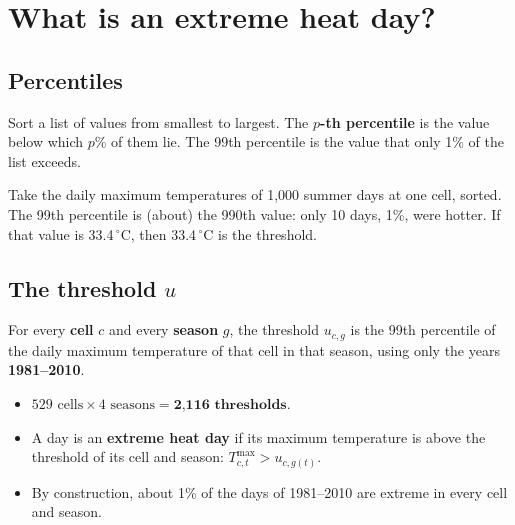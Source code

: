 \chapter{What is an extreme heat day?}
\label{ch:extreme}

\section{Percentiles}
Sort a list of values from smallest to largest. The \textbf{$p$-th percentile} is the value below which $p$\% of them
lie. The 99th percentile is the value that only 1\% of the list exceeds.

\begin{example}
Take the daily maximum temperatures of 1{,}000 summer days at one cell, sorted. The 99th percentile is (about) the
990th value: only 10 days, 1\%, were hotter. If that value is 33.4\,$^\circ$C, then 33.4\,$^\circ$C is the threshold.
\end{example}

\section{The threshold $u$}
For every \textbf{cell} $c$ and every \textbf{season} $g$, the threshold $u_{c,g}$ is the 99th percentile of the daily
maximum temperature of that cell in that season, using only the years \textbf{1981--2010}.
\begin{itemize}
  \item $529\text{ cells}\times4\text{ seasons}=\textbf{2{,}116 thresholds}$.
  \item A day is an \textbf{extreme heat day} if its maximum temperature is above the threshold of its cell and season:
        $T^{\max}_{c,t}>u_{c,g(t)}$.
  \item By construction, about 1\% of the days of 1981--2010 are extreme in every cell and season.
\end{itemize}

